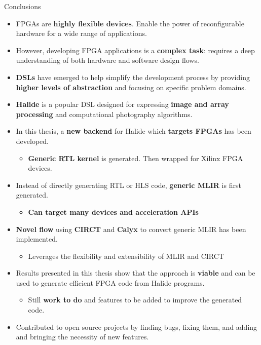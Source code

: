\documentclass[8pt,a4paper,oneside,hidelinks,aspectratio=169,dvipsnames]{beamer}
\begin{document}
\begin{frame}{Conclusions}
  \begin{itemize}
    \item FPGAs are \textbf{highly flexible devices}. Enable the power of reconfigurable hardware for a wide range of applications.
    \item However, developing FPGA applications is a \textbf{complex task}: requires a deep understanding of both hardware and software design flows.
    \item \textbf{DSLs} have emerged to help simplify the development process by providing \textbf{higher levels of abstraction} and focusing on specific problem domains.
    \item \textbf{Halide} is a popular DSL designed for expressing \textbf{image and array processing} and computational photography algorithms.
    \item In this thesis, a \textbf{new backend} for Halide which \textbf{targets FPGAs} has been developed.
          \begin{itemize}
            \item \textbf{Generic RTL kernel} is generated. Then wrapped for Xilinx FPGA devices.
          \end{itemize}
    \item Instead of directly generating RTL or HLS code, \textbf{generic MLIR} is first generated.
          \begin{itemize}
            \item \textbf{Can target many devices and acceleration APIs}
          \end{itemize}
    \item \textbf{Novel flow} using \textbf{CIRCT} and \textbf{Calyx} to convert generic MLIR has been implemented.
          \begin{itemize}
            \item Leverages the flexibility and extensibility of MLIR and CIRCT
          \end{itemize}
    \item Results presented in this thesis show that the approach is \textbf{viable} and can be used to generate efficient FPGA code from Halide programs.
          \begin{itemize}
            \item Still \textbf{work to do} and features to be added to improve the generated code.
          \end{itemize}
    \item Contributed to open source projects by finding bugs, fixing them, and adding and bringing the necessity of new features.
  \end{itemize}
\end{frame}
\end{document}
